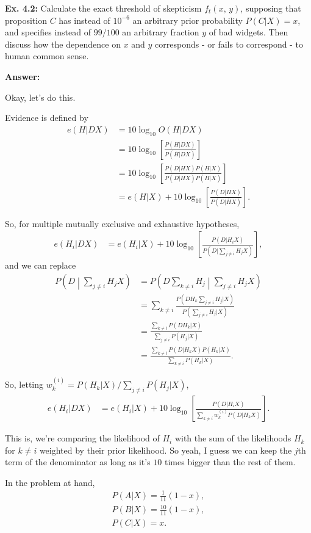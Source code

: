 \documentclass{article}
\begin{document}
\textbf{Ex. 4.2: }Calculate the exact threshold of skepticism $f_t(x,\,y)$, supposing that proposition $C$ has instead of $10^{-6}$ an arbitrary prior probability $P(C|X)=x$, and specifies instead of $99/100$ an arbitrary fraction $y$ of bad widgets. Then discuss how the dependence on $x$ and $y$ corresponds - or fails to correspond - to human common sense.

\textbf{Answer:}

Okay, let's do this.

Evidence is defined by
\begin{align*}
	e(H|DX)&=10\log_{10}O(H|DX)\\
	&=10\log_{10}\left[\frac{P(H|DX)}{P(\overline{H}|DX)}\right]\\
	&=10\log_{10}\left[\frac{P(D|HX)P(H|X)}{P(D|\overline{H}X)P(\overline{H}|X)}\right]\\
	&=e(H|X)+10\log_{10}\left[\frac{P(D|HX)}{P(D|\overline{H}X)}\right].
\end{align*}

So, for multiple mutually exclusive and exhaustive hypotheses,
\begin{align*}
	e(H_i|DX)&=e(H_i|X)+10\log_{10}\left[\frac{P(D|H_iX)}{P(D|\sum_{j\neq i}H_jX)}\right],
\end{align*}
and we can replace
\begin{align}
	P\left(D\middle|\sum_{j\neq i}H_jX\right)&=P\left(D\sum_{k\neq i}H_j\middle|\sum_{j\neq i}H_jX\right)\\
	&=\sum_{k\neq i}\frac{P(DH_k\sum_{j\neq i}H_j|X)}{P(\sum_{j\neq i}H_j|X)}\\
	&=\frac{\sum_{k\neq i}P(DH_k|X)}{\sum_{j\neq i}P(H_j|X)}\\
	&=\frac{\sum_{k\neq i}P(D|H_kX)P(H_k|X)}{\sum_{k\neq i}P(H_k|X)}.
\end{align}

So, letting $w_k^{(i)}=P(H_k|X)/\sum_{j\neq i}P(H_j|X)$,
\begin{align*}
	e(H_i|DX)&=e(H_i|X)+10\log_{10}\left[\frac{P(D|H_iX)}{\sum_{k\neq i}w_k^{(i)}P(D|H_kX)}\right].
\end{align*}

This is, we're comparing the likelihood of $H_i$ with the sum of the likelihoods $H_k$ for $k\neq i$ weighted by their prior likelihood. So yeah, I guess we can keep the $j$th term of the denominator as long as it's $10$ times bigger than the rest of them.

In the problem at hand,
\begin{align*}
	P(A|X)=\frac1{11}(1-x),\\
	P(B|X)=\frac{10}{11}(1-x),\\
	P(C|X)=x.
\end{align*}
\end{document}

